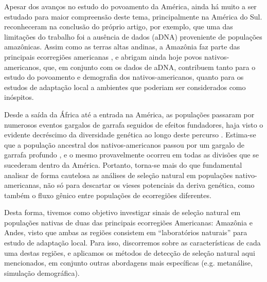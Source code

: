 Apesar dos avanços no estudo do povoamento da América, ainda há muito a ser estudado para maior compreensão deste tema, principalmente na América do Sul.  reconheceram na conclusão do próprio artigo, por exemplo, que uma das limitações do trabalho foi a ausência de dados (aDNA) proveniente de populações amazônicas. Assim como as terras altas andinas, a Amazônia faz parte das principais ecorregiões americanas \cite{antonelli_amazonia_2018}, e abrigam ainda hoje povos nativos-americanos, que, em conjunto com os dados de aDNA, contribuem tanto para o estudo do povoamento e demografia dos nativos-americanos, quanto para os estudos de adaptação local a ambientes que poderiam ser considerados como inóspitos. 

Desde a saída da África até a entrada na América, as populações passaram por numerosos eventos gargalos de garrafa seguidos de efeitos fundadores, haja visto o evidente decréscimo da diversidade genética ao longo deste percurso \cite{prugnolle_geography_2005}. Estima-se que a população ancestral dos nativos-americanos passou por um gargalo de garrafa profundo \cite{fagundes_mitochondrial_2008}, e o mesmo provavelmente ocorreu em todas as divisões que se sucederam dentro da América. Portanto, torna-se mais do que fundamental analisar de forma cautelosa as análises de seleção natural em populações nativo-americanas, não só para descartar os vieses potenciais da deriva genética, como também o fluxo gênico entre populações de ecorregiões diferentes.

Desta forma, tivemos como objetivo investigar sinais de seleção natural em populações nativas de duas das principais ecorregiões Americanas: Amazônia e Andes, visto que ambas as regiões consistem em “laboratórios naturais” para estudo de adaptação local. Para isso, discorremos sobre as características de cada uma destas regiões, e aplicamos os métodos de detecção de seleção natural aqui mencionados, em conjunto outras abordagens mais específicas (e.g. metanálise, simulação demográfica).
